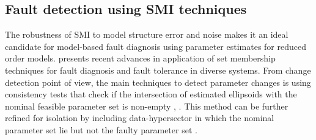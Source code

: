 \subsection{Fault detection using SMI techniques}

The robustness of SMI to model structure error and noise makes it an ideal candidate for model-based fault diagnosis
using parameter estimates for reduced order models. \cite{combastel2016set} presents recent advances in application of
set membership techniques for fault diagnosis and fault tolerance in diverse systems. From change detection point of
view, the main techniques to detect parameter changes is using consistency tests that check if the intersection of
estimated ellipsoids with the nominal feasible parameter set is non-empty \cite{watkins1996fault},
\cite{ingimundarson2009robust}. This method can be further refined for isolation by including data-hypersector in which
the nominal parameter set lie but not the faulty parameter set \cite{reppa2016fault}.
